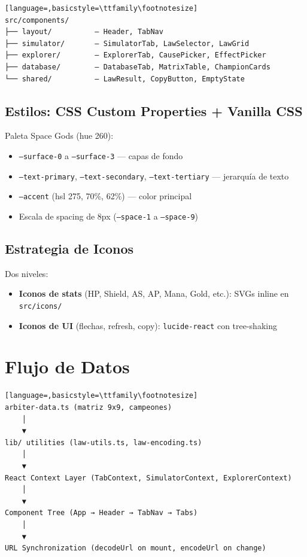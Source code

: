 \documentclass[11pt,a4paper]{report}
\begin{document}
\begin{lstlisting}[language=,basicstyle=\ttfamily\footnotesize]
src/components/
├── layout/          — Header, TabNav
├── simulator/       — SimulatorTab, LawSelector, LawGrid
├── explorer/        — ExplorerTab, CausePicker, EffectPicker
├── database/        — DatabaseTab, MatrixTable, ChampionCards
└── shared/          — LawResult, CopyButton, EmptyState
\end{lstlisting}

\subsection{Estilos: CSS Custom Properties + Vanilla CSS}

Paleta Space Gods (hue 260):
\begin{itemize}
  \item \texttt{--surface-0} a \texttt{--surface-3} — capas de fondo
  \item \texttt{--text-primary}, \texttt{--text-secondary}, \texttt{--text-tertiary} — jerarquía de texto
  \item \texttt{--accent} (hsl 275, 70\%, 62\%) — color principal
  \item Escala de spacing de 8px (\texttt{--space-1} a \texttt{--space-9})
\end{itemize}

\subsection{Estrategia de Iconos}

Dos niveles:
\begin{itemize}
  \item \textbf{Iconos de stats} (HP, Shield, AS, AP, Mana, Gold, etc.): SVGs inline en \texttt{src/icons/}
  \item \textbf{Iconos de UI} (flechas, refresh, copy): \texttt{lucide-react} con tree-shaking
\end{itemize}

\section{Flujo de Datos}

\begin{lstlisting}[language=,basicstyle=\ttfamily\footnotesize]
arbiter-data.ts (matriz 9x9, campeones)
    │
    ▼
lib/ utilities (law-utils.ts, law-encoding.ts)
    │
    ▼
React Context Layer (TabContext, SimulatorContext, ExplorerContext)
    │
    ▼
Component Tree (App → Header → TabNav → Tabs)
    │
    ▼
URL Synchronization (decodeUrl on mount, encodeUrl on change)
\end{lstlisting}
\end{document}

